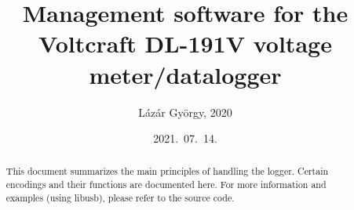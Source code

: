 \documentclass[a4paper,12pt]{article}
\title{\bf Management software for the Voltcraft DL-191V voltage meter/datalogger}
\author{ Lázár György, 2020\\
}
\date{2021.\ 07.\ 14.}
\begin{document}
\maketitle

\begin{abstract}
This document summarizes the main principles of handling the logger. Certain encodings and their functions are documented here. For more information and examples (using libusb), please refer to the source code.
\end{abstract}
\end{document}
